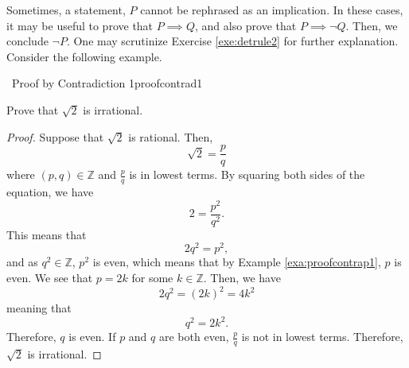         Sometimes, a statement, \(P\) cannot be rephrased as an implication. In these cases, it may be useful to prove that \(P\implies Q\), and also prove that \(P\implies \neg Q\). Then, we conclude \(\neg P\). One may scrutinize Exercise \ref{exe:detrule2} for further explanation. Consider the following example.
        \begin{example}{\Difficulty\,\Difficulty\,\,Proof by Contradiction 1}{proofcontrad1}
        
            Prove that \(\sqrt{2}\) is irrational.
            
            \begin{proof}
                Suppose that \(\sqrt{2}\) is rational. Then,
                \begin{equation*}
                    \sqrt{2}=\frac{p}{q}
                \end{equation*}
                where \((p,q)\in\mathbb{Z}\) and \(\frac{p}{q}\) is in lowest terms. By squaring both sides of the equation, we have
                \begin{equation*}
                    2=\frac{p^2}{q^2}.
                \end{equation*}
                This means that
                \begin{equation*}
                    2q^2=p^2,
                \end{equation*}
                and as \(q^2\in\mathbb{Z}\), \(p^2\) is even, which means that by Example \ref{exa:proofcontrap1}, \(p\) is even. We see that \(p=2k\) for some \(k\in\mathbb{Z}\). Then, we have
                \begin{equation*}
                    2q^2=(2k)^2=4k^2
                \end{equation*}
                meaning that
                \begin{equation*}
                    q^2=2k^2.
                \end{equation*}
                Therefore, \(q\) is even. If \(p\) and \(q\) are both even, \(\frac{p}{q}\) is not in lowest terms. Therefore, \(\sqrt{2}\) is irrational.
            \end{proof}
        
        \end{example}